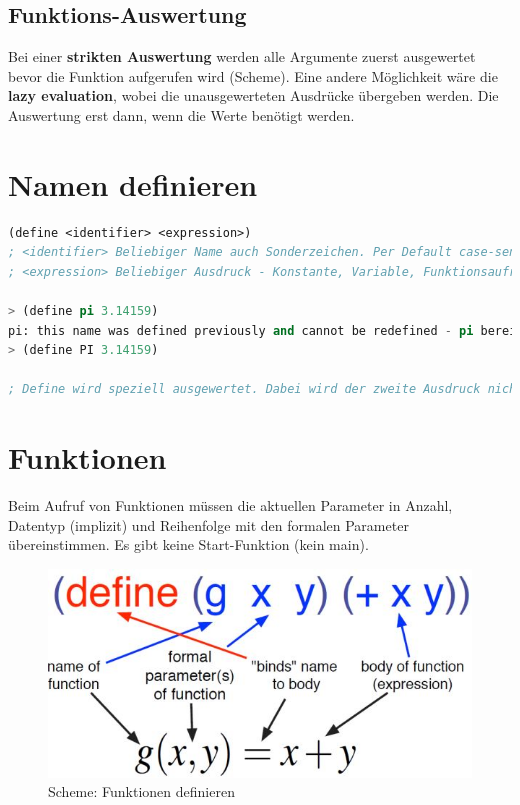 \subsection{Funktions-Auswertung}
Bei einer \textbf{strikten Auswertung} werden alle Argumente zuerst ausgewertet bevor die Funktion aufgerufen wird (Scheme). Eine andere Möglichkeit wäre die \textbf{lazy evaluation}, wobei die unausgewerteten Ausdrücke übergeben werden. Die Auswertung erst dann, wenn die Werte benötigt werden.

\newpage
\section{Namen definieren}
\begin{lstlisting}[language=Lisp, caption=Namen definieren]
(define <identifier> <expression>)
; <identifier> Beliebiger Name auch Sonderzeichen. Per Default case-sensitive, in DrRacket ausschaltbar.
; <expression> Beliebiger Ausdruck - Konstante, Variable, Funktionsaufruf, ...

> (define pi 3.14159)
pi: this name was defined previously and cannot be redefined - pi bereits eine Scheme Konstante
> (define PI 3.14159)

; Define wird speziell ausgewertet. Dabei wird der zweite Ausdruck nicht ausgewertet (im Beispiel pi). Zudem ist der Rückgabewerte von define nicht spezifiziert.
\end{lstlisting}

\section{Funktionen}
Beim Aufruf von Funktionen müssen die aktuellen Parameter in Anzahl, Datentyp (implizit) und Reihenfolge mit den formalen Parameter übereinstimmen. Es gibt keine Start-Funktion (kein main).

\begin{figure}[h!]
\centering
\includegraphics[width=0.5\linewidth]{fig/scheme-function-definition}
\caption{Scheme: Funktionen definieren}
\label{fig:scheme-function-definition}
\end{figure}

